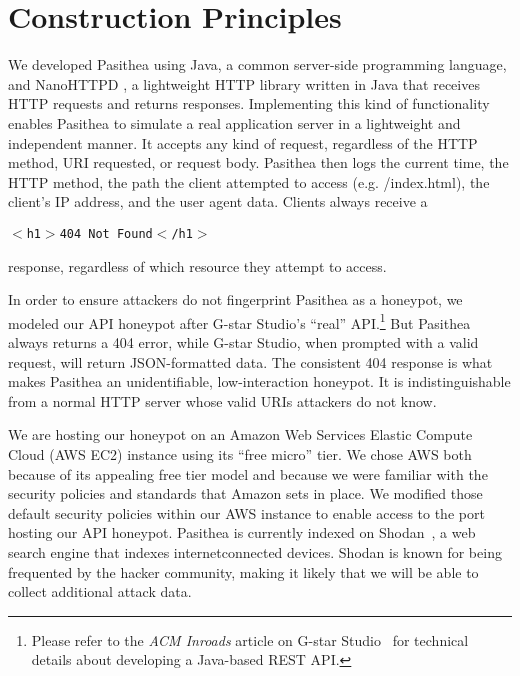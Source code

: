 
\section{Construction Principles} \label{construction}

We developed Pasithea using Java, a common server-side programming language, and NanoHTTPD \cite{Nanohttpd}, a lightweight HTTP library written in Java that receives HTTP requests and returns responses.
Implementing this kind of functionality enables Pasithea to simulate a real application server in a lightweight and independent manner. 
It accepts any kind of request, regardless of the HTTP method, URI requested, or request body. 
Pasithea then logs the current time, the HTTP method, the path the client attempted to access (e.g. /index.html), the client's IP address, and the user agent data. 
Clients always receive a
 

\begin{center}  %
\texttt{$<$h1$>$404 Not Found$<$/h1$>$ }
\end{center}

\noindent
response, regardless of which resource they attempt to access.

In order to ensure attackers do not fingerprint Pasithea as a honeypot, we modeled our API honeypot after G-star Studio's ``real'' API.\footnote{
Please refer to the {\em ACM Inroads} article on G-star Studio~\cite{inroads-Labouseur16} for technical details about developing a Java-based REST API.
} 
But Pasithea always returns a 404 error, while G-star Studio, when prompted with a valid request, will return JSON-formatted data. 
The consistent 404 response is what makes Pasithea an unidentifiable, low-interaction honeypot. 
It is indistinguishable from a normal HTTP server whose valid URIs attackers do not know. 

We are hosting our honeypot on an Amazon Web Services Elastic Compute Cloud (AWS EC2) instance using its ``free micro'' tier. 
We chose AWS both because of its appealing free tier model and because we were familiar with the security policies and standards that Amazon sets in place. 
We modified those default security policies within our AWS instance to enable access to the port hosting our API honeypot. 
Pasithea is currently indexed on Shodan~\cite{unsavoryChar}, a web search engine that indexes internetconnected devices.
Shodan is known for being frequented by the hacker community, making it likely that we will be able to collect additional attack data.
